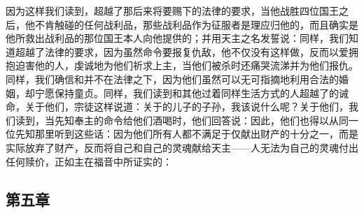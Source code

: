 因为这样我们读到，超越了那后来将要赐下的法律的要求，当他战胜四位国王之后，他不肯触碰的任何战利品，那些战利品作为征服者是理应归他的，而且确实是他所救出战利品的那位国王本人向他提供的；并用天主之名发誓说：同样，我们知道超越了法律的要求，因为虽然命令要报复仇敌，他不仅没有这样做，反而以爱拥抱迫害他的人，虔诚地为他们祈求上主，当他们被杀时还痛哭流涕并为他们报仇。同样，我们确信和并不在法律之下，因为他们虽然可以无可指摘地利用合法的婚姻，却宁愿保持童贞。同样，我们读到和其他过着同样生活方式的人超越了的诫命，关于他们，宗徒这样说道：关于的儿子的子孙，我该说什么呢？关于他们，我们读到，当先知奉主的命令给他们酒喝时，他们回答说：因此，他们也得以从同一位先知那里听到这些话：因为他们所有人都不满足于仅献出财产的十分之一，而是实际放弃了财产，反而将自己和自己的灵魂献给天主——人无法为自己的灵魂付出任何赎价，正如主在福音中所证实的：\par


\subsection{第五章}

\par

